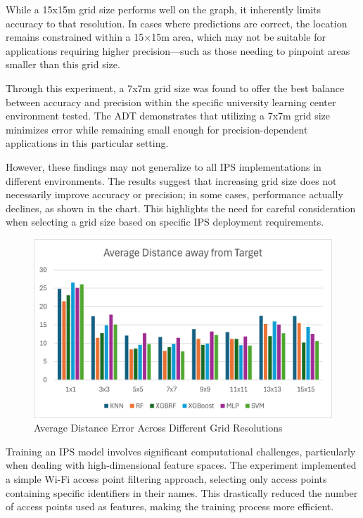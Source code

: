 \documentclass[runningheads]{llncs}
\begin{document}
While a 15x15m grid size performs well on the graph, it inherently limits accuracy to that resolution. In cases where predictions are correct, the location remains constrained within a 15×15m area, which may not be suitable for applications requiring higher precision—such as those needing to pinpoint areas smaller than this grid size.

Through this experiment, a 7x7m grid size was found to offer the best balance between accuracy and precision within the specific university learning center environment tested. The ADT demonstrates that utilizing a 7x7m grid size minimizes error while remaining small enough for precision-dependent applications in this particular setting. 

However, these findings may not generalize to all IPS implementations in different environments. The results suggest that increasing grid size does not necessarily improve accuracy or precision; in some cases, performance actually declines, as shown in the chart. This highlights the need for careful consideration when selecting a grid size based on specific IPS deployment requirements.



\begin{figure}[htbp]
	\centerline{\includegraphics[scale=0.65]{image2.png}}
	\caption{Average Distance Error Across Different Grid Resolutions}
	\label{fig:Avg_dis_err}
\end{figure}

Training an IPS model involves significant computational challenges, particularly when dealing with high-dimensional feature spaces. The experiment implemented a simple Wi-Fi access point filtering approach, selecting only access points containing specific identifiers in their names. This drastically reduced the number of access points used as features, making the training process more efficient.
\end{document}
